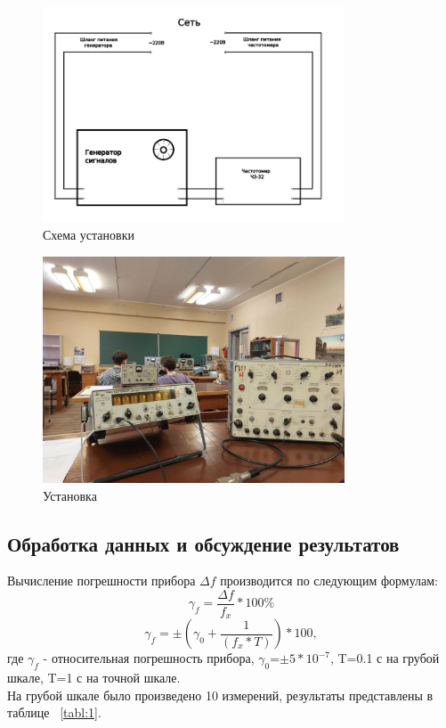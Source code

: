 \begin{figure}[H]
\centering
\includegraphics[width=0.8\textwidth]{Схема установки}
\caption{Схема установки}
\label{fig:Схема установки}
\end{figure}



\begin{figure}[H]
\centering
\includegraphics[width=0.8\textwidth]{Установка.jpg}
\caption{Установка}
\label{fig:установка}
\end{figure}

\subsection{Обработка данных и обсуждение результатов}
Вычисление погрешности прибора $\Delta f$ производится по следующим формулам:
\begin{equation}
   \gamma_f=  \frac{\Delta f}{f_x}*100\%
\end{equation}
\begin{equation}
 \gamma_f=\pm(\gamma_0+\frac{1}{(f_x*T)})*100,
 \end{equation}
 где $\gamma_f$ - относительная погрешность прибора, $\gamma_0$=$\pm$$5*10^{-7}$, T=0.1 с на грубой шкале, T=1 с на точной шкале.\\
 На грубой шкале было произведено 10 измерений, результаты представлены в таблице ~\ref{tabl:1}.

